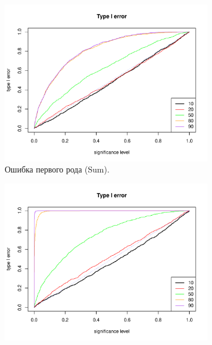 \documentclass[specialist,
substylefile = spbu_report.rtx,
subf,href,colorlinks=true, 12pt]{disser}
\theoremstyle{definition}
\begin{document}
	\begin{figure}
		\captionsetup[subfigure]{justification=Centering}
		\begin{subfigure}[t]{0.45\textwidth}
			\centering
			\includegraphics[width=\textwidth]{type1error_sum_ev.pdf}
			\caption{Ошибка первого рода (Sum).}
		\end{subfigure}\hspace{\fill}
		\begin{subfigure}[t]{0.45\textwidth}
			\centering
			\includegraphics[width=\textwidth]{type1error_mssa_ev.pdf}

\end{subfigure}
\end{figure}
\end{document}
